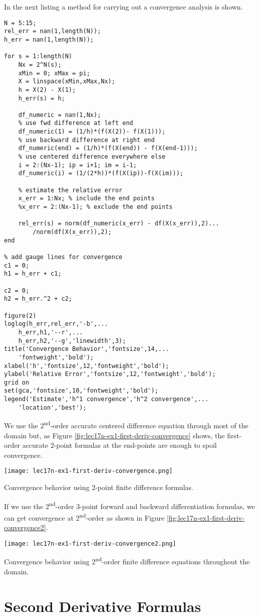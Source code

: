 In the next listing a method for carrying out a convergence analysis is shown.
\begin{lstlisting}[style=myMatlab,name=lec17n-ex1]
%% Get Convergence Rate
N = 5:15;
rel_err = nan(1,length(N));
h_err = nan(1,length(N));

for s = 1:length(N)
    Nx = 2^N(s);
    xMin = 0; xMax = pi;
    X = linspace(xMin,xMax,Nx);
    h = X(2) - X(1);
    h_err(s) = h;
    
    df_numeric = nan(1,Nx);
    % use fwd difference at left end
    df_numeric(1) = (1/h)*(f(X(2))- f(X(1)));
    % use backward difference at right end
    df_numeric(end) = (1/h)*(f(X(end)) - f(X(end-1)));
    % use centered difference everywhere else
    i = 2:(Nx-1); ip = i+1; im = i-1;
    df_numeric(i) = (1/(2*h))*(f(X(ip))-f(X(im)));
    
    % estimate the relative error
    x_err = 1:Nx; % include the end points
    %x_err = 2:(Nx-1); % exclude the end points
   
    rel_err(s) = norm(df_numeric(x_err) - df(X(x_err)),2)...
        /norm(df(X(x_err)),2);    
end

% add gauge lines for convergence
c1 = 0;
h1 = h_err + c1;

c2 = 0;
h2 = h_err.^2 + c2;

figure(2)
loglog(h_err,rel_err,'-b',...
    h_err,h1,'--r',...
    h_err,h2,'--g','linewidth',3);
title('Convergence Behavior','fontsize',14,...
    'fontweight','bold');
xlabel('h','fontsize',12,'fontweight','bold');
ylabel('Relative Error','fontsize',12,'fontweight','bold');
grid on
set(gca,'fontsize',10,'fontweight','bold');
legend('Estimate','h^1 convergence','h^2 convergence',...
    'location','best');
\end{lstlisting}
We use the 2\textsuperscript{nd}-order accurate centered difference equation through most of the domain but, as Figure \ref{fig:lec17n-ex1-first-deriv-convergence} shows, the first-order accurate 2-point formulas at the end-points are enough to spoil convergence.

\begin{marginfigure}[-10.0cm]
\texttt{[image: lec17n-ex1-first-deriv-convergence.png]}
\caption{Convergence behavior using 2-point finite difference formulas.}
\label{fig:lec17n-ex1-first-deriv-convergence}
\end{marginfigure}

If we use the 2\textsuperscript{nd}-order 3-point forward and backward differentiation formulas, we can get convergence at 2\textsuperscript{nd}-order as shown in Figure \ref{fig:lec17n-ex1-first-deriv-convergence2}.

\begin{marginfigure}[-3.0cm]
\texttt{[image: lec17n-ex1-first-deriv-convergence2.png]}
\caption{Convergence behavior using 2\textsuperscript{nd}-order finite difference equations throughout the domain.}
\label{fig:lec17n-ex1-first-deriv-convergence2}
\end{marginfigure}

\section{Second Derivative Formulas}

